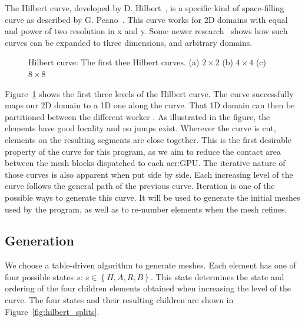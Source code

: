 The Hilbert curve, developed by D. Hilbert~\cite{Hilbert1891}, is a specific kind of space-filling
curve as described by G. Peano~\cite{Peano1890}. This curve works for 2D domains with equal and
power of two resolution in x and y. Some newer research~\cite{Haverkort2011} shows how such curves
can be expanded to three dimensions, and arbitrary domains.

\begin{figure}[H]
	\centering
	\hfill
	\hfill
	\caption{Hilbert curve: The first thee Hilbert curves. (a) \(2\times2\) (b) \(4\times4\) (c) \(8\times8\)}\label{fig:hilbert_curves}
\end{figure}

Figure~\ref{fig:hilbert_curves} shows the first three levels of the Hilbert curve. The curve
successfully maps our 2D domain to a 1D one along the curve. That 1D domain can then be partitioned
between the different worker . As illustrated in the figure, the elements have
good locality and no jumps exist. Wherever the curve is cut, elements on the resulting segments are
close together. This is the first desirable property of the curve for this program, as we aim to
reduce the contact area between the mesh blocks dispatched to each \acrshort{acr:GPU}. The iterative
nature of those curves is also apparent when put side by side. Each increasing level of the curve
follows the general path of the previous curve. Iteration is one of the possible ways to generate
this curve. It will be used to generate the initial meshes used by the program, as well as to
re-number elements when the mesh refines.

\subsection{Generation}\label{subsection:load_balancing:hilbert_curve:generation}

We choose a table-driven algorithm to generate meshes. Each element has one of four possible states
\(s\): \(s \in \left \{H, A, R, B \right \} \). This state determines the state and ordering of the
four children elements obtained when increasing the level of the curve. The four states and their
resulting children are shown in Figure~\ref{fig:hilbert_splits}.

